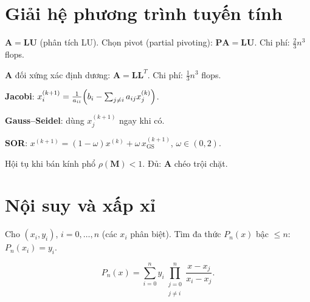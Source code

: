 \documentclass[12pt,a4paper]{article}
\begin{document}
\section{Giải hệ phương trình tuyến tính}

\begin{phuongphap}[title={Khử Gauss (LU)}]
  $\mathbf{A} = \mathbf{L}\mathbf{U}$ (phân tích LU). Chọn pivot (partial pivoting): $\mathbf{P}\mathbf{A} = \mathbf{L}\mathbf{U}$. Chi phí: $\frac{2}{3}n^3$ flops.
\end{phuongphap}

\begin{phuongphap}[title={Phân tích Cholesky}]
  $\mathbf{A}$ đối xứng xác định dương: $\mathbf{A} = \mathbf{L}\mathbf{L}^T$. Chi phí: $\frac{1}{3}n^3$ flops.
\end{phuongphap}

\begin{phuongphap}[title={Phương pháp lặp: Jacobi, Gauss--Seidel, SOR}]
  \textbf{Jacobi}: $x_i^{(k+1)} = \frac{1}{a_{ii}}\Bigl(b_i - \sum_{j \ne i}a_{ij}x_j^{(k)}\Bigr)$.

  \textbf{Gauss--Seidel}: dùng $x_j^{(k+1)}$ ngay khi có.

  \textbf{SOR}: $x^{(k+1)} = (1-\omega)x^{(k)} + \omega\,x^{(k+1)}_{\text{GS}}$, $\omega \in (0, 2)$.

  Hội tụ khi bán kính phổ $\rho(\mathbf{M}) < 1$. Đủ: $\mathbf{A}$ chéo trội chặt.
\end{phuongphap}

\section{Nội suy và xấp xỉ}

\begin{dinhnghia}[title={Nội suy đa thức}]
  Cho $(x_i, y_i)$, $i = 0, \ldots, n$ (các $x_i$ phân biệt). Tìm đa thức $P_n(x)$ bậc $\le n$: $P_n(x_i) = y_i$.
\end{dinhnghia}

\begin{congthuc}[title={Nội suy Lagrange}]
  \[
    P_n(x) = \sum_{i=0}^{n} y_i \prod_{\substack{j=0\\j \ne i}}^{n} \frac{x - x_j}{x_i - x_j}.
  \]
\end{congthuc}
\end{document}
